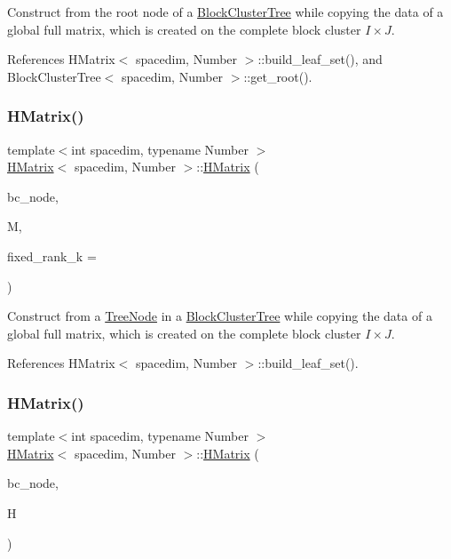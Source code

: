 Construct from the root node of a \hyperlink{classBlockClusterTree}{Block\+Cluster\+Tree} while copying the data of a global full matrix, which is created on the complete block cluster $I \times J$. 

References H\+Matrix$<$ spacedim, Number $>$\+::build\+\_\+leaf\+\_\+set(), and Block\+Cluster\+Tree$<$ spacedim, Number $>$\+::get\+\_\+root().

\mbox{\label{classHMatrix_abb59b3981e9f32f319479088d786989d}} 
\subsubsection{\texorpdfstring{H\+Matrix()}{HMatrix()}\hspace{0.1cm}{\footnotesize\ttfamily [5/9]}}
{\footnotesize\ttfamily template$<$int spacedim, typename Number $>$ \\
\hyperlink{classHMatrix}{H\+Matrix}$<$ spacedim, Number $>$\+::\hyperlink{classHMatrix}{H\+Matrix} (\begin{DoxyParamCaption}\item[{typename \hyperlink{classBlockClusterTree}{Block\+Cluster\+Tree}$<$ spacedim, Number $>$\+::node\+\_\+const\+\_\+pointer\+\_\+type}]{bc\+\_\+node,  }\item[{const \hyperlink{classLAPACKFullMatrixExt}{L\+A\+P\+A\+C\+K\+Full\+Matrix\+Ext}$<$ Number $>$ \&}]{M,  }\item[{const unsigned int}]{fixed\+\_\+rank\+\_\+k = {} }\end{DoxyParamCaption})}

Construct from a \hyperlink{classTreeNode}{Tree\+Node} in a \hyperlink{classBlockClusterTree}{Block\+Cluster\+Tree} while copying the data of a global full matrix, which is created on the complete block cluster $I \times J$. 

References H\+Matrix$<$ spacedim, Number $>$\+::build\+\_\+leaf\+\_\+set().

\mbox{\label{classHMatrix_abeb8d0add9bffecafc12f4c6b1dcab8e}} 
\subsubsection{\texorpdfstring{H\+Matrix()}{HMatrix()}\hspace{0.1cm}{\footnotesize\ttfamily [6/9]}}
{\footnotesize\ttfamily template$<$int spacedim, typename Number $>$ \\
\hyperlink{classHMatrix}{H\+Matrix}$<$ spacedim, Number $>$\+::\hyperlink{classHMatrix}{H\+Matrix} (\begin{DoxyParamCaption}\item[{typename \hyperlink{classBlockClusterTree}{Block\+Cluster\+Tree}$<$ spacedim, Number $>$\+::node\+\_\+const\+\_\+pointer\+\_\+type}]{bc\+\_\+node,  }\item[{\hyperlink{classHMatrix}{H\+Matrix}$<$ spacedim, Number $>$ \&\&}]{H }\end{DoxyParamCaption})}

